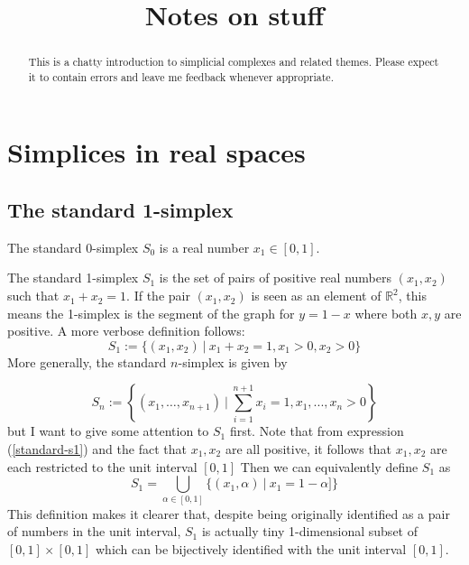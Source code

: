 \documentclass{tufte-handout}
\title{Notes on stuff}
\author[Diego Navarro}
\date{}
\newcommand{\re}{\mathbb{R}}
\begin{document}
\maketitle%

\begin{abstract}
\noindent This is a chatty introduction to simplicial complexes and related themes.  Please expect it to contain errors and leave me feedback whenever appropriate. 
\end{abstract}

\section{Simplices in real spaces}

\subsection{The standard 1-simplex}
The standard 0-simplex $S_0$ is a real number $x_1\in[0,1]$.

The standard 1-simplex $S_1$ is the set of pairs of positive real numbers $(x_1,x_2)$ such that $x_1+x_2=1$. If the pair $(x_1, x_2)$ is seen as an element of $\re^2$, this means the 1-simplex is the segment of the graph for $y=1-x$ where both $x,y$ are positive. A more verbose definition follows:
\begin{equation}
    S_1 := \{(x_1,x_2)\ |\ x_1+x_2=1, x_1>0, x_2>0\}
\label{standard-s1}
\end{equation}
More generally, the standard $n$-simplex is given by

\begin{equation}
    S_n := \left\{(x_1,\ldots,x_{n+1})\ |\ \sum_{i=1}^{n+1} x_i = 1, x_1,...,x_n >0 \right\}
\label{standard-sn}
\end{equation}
but I want to give some attention to $S_1$ first.
Note that from expression (\ref{standard-s1}) and the fact that $x_1,x_2$ are all positive, it follows that $x_1,x_2$ are each restricted to the unit interval $[0,1]$ Then we can equivalently define $S_1$ as
\begin{equation}
    S_1 = \bigcup_{\alpha\in [0,1]} \{{(x_1,\alpha)}\ |\ x_1 = 1-\alpha]\}
\label{union-1}
\end{equation}
This definition makes it clearer that, despite being originally identified as a pair of numbers in the unit interval, $S_1$ is actually tiny 1-dimensional subset of $[0,1]\times[0,1]$ which can be bijectively identified with the unit interval $[0,1]$. 
\end{document}
